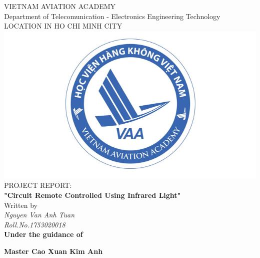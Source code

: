 \documentclass[a4paper]{report}
\begin{document}
    \centering
    \LARGE{\textsc{VIETNAM AVIATION ACADEMY}} \\
    \vspace{3mm}
    \normalsize{Department of Telecomunication - Electronics Engineering Technology} \\
    \vspace{3mm}
    \large{LOCATION IN HO CHI MINH CITY} \\
    \vspace{3mm}
    \includegraphics[scale=0.3]{logo.jpg} \\
    \vspace{3mm}
    \normalsize{PROJECT REPORT:} \\
    \vspace{15mm}
    \huge{\textbf{"Circuit Remote Controlled Using Infrared Light"}} \\
    \vspace{20mm}
    \normalsize{Written by} \\
    \vspace{3mm}
    \large{\textit{Nguyen Van Anh Tuan}} \\ 
    \vspace{3mm}
    \textit{\large{Roll.No.1753020018}} \\
    \vspace{15mm}
    \textbf{\large{Under the guidance of}} \\
    \vspace{10mm}
    \centerline{\textbf{\large{Master Cao Xuan Kim Anh}}}

    \pagestyle{fancy}
    \fancyhf{}
    \cfoot{\today}
    \renewcommand{\headrulewidth}{2pt}
    \renewcommand{\footrulewidth}{1pt}
\end{document}
